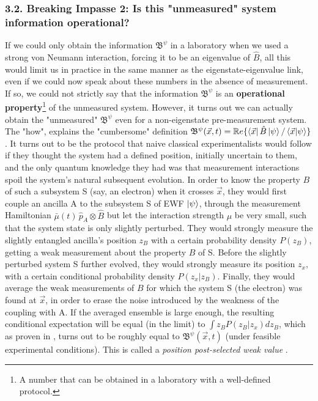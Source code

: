 \documentclass[11pt, a4paper]{article} %
\newcommand{\B}{\mathfrak{B}}
\begin{document}
\subsubsection*{3.2. Breaking Impasse 2: Is this "unmeasured" system information operational?}\vspace{-0.15cm}
If we could only obtain the information $\B^\psi$ in a laboratory when we used a strong von Neumann interaction, forcing it to be an eigenvalue of $\hat{B}$, all this would limit us in practice in the same manner as the eigenstate-eigenvalue link, even if we could now speak about these numbers in the absence of measurement. If so, we could not strictly say that the information $\B^\psi$ is an {\bf operational property}\footnote{A number that can be obtained in a laboratory with a well-defined protocol.} of the unmeasured system. However, it turns out we can actually obtain the "unmeasured" $\B^\psi$ even for a non-eigenstate pre-measurement system. The "how", explains the "cumbersome" definition $\B^\psi(\vec{x},t)=\mathbb{R}e\{\bra{\vec{x}}\hat{B}\ket{\psi}/\bra{\vec{x}}\ket{\psi}\}$. It turns out to be the protocol that naive classical experimentalists \cite{WisemanVel} would follow if they thought the system had a defined position, initially uncertain to them, and the only quantum knowledge they had was that measurement interactions spoil the system's natural subsequent evolution. In order to know the property $B$ of such a subsystem S (say, an electron) when it crosses $\vec{x}$, they would first couple an ancilla A to the subsystem S of EWF $\ket{\psi}$, through the measurement Hamiltonian $\bar{\mu}(t)\,\hat{p}_A\otimes\hat{B}$ but let the interaction strength $\mu$ be very small, such that the system state is only slightly perturbed. They would strongly measure the slightly entangled ancilla's position $z_B$ with a certain probability density $P(z_B)$, getting a weak measurement about the property $B$ of S. Before the slightly perturbed system S further evolved, they would strongly measure its position $z_x$, with a certain conditional probability density $P(z_x|z_B)$. Finally, they would average the weak measurements of $B$ for which the system S (the electron) was found at $\vec{x}$, in order to erase the noise introduced by the weakness of the coupling with A. If the averaged ensemble is large enough, the resulting conditional expectation will be equal (in the limit) to $\int z_B P(z_B|z_x)dz_B$, which as proven in \cite{DevInPosition2}, turns out to be roughly equal to $\B^\psi(\vec{x},t)$ (under feasible experimental conditions). This is called a {\em position post-selected weak value} \cite{Weak}.
\end{document}
